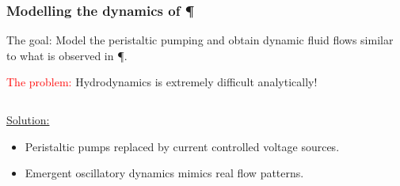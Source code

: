 \documentclass[	hyperref={pdfpagelabels=false}, xcolor=dvipsnames,
		11pt]{beamer}
\begin{document}
\begin{frame}
    \frametitle{Modelling the dynamics of \P} 

    \begin{block}{The goal:}
    	\vspace{-0.25cm}
    	Model the peristaltic pumping and obtain dynamic fluid flows similar to what is observed in \P.
    \end{block}

	\textcolor{red}{The problem:} Hydrodynamics is extremely difficult analytically!

	\begin{columns}
	\begin{column}{4.5cm}

	\begin{overprint}

		\begin{alertblock}{\underline{Solution:}}
		  \begin{itemize}
		   \item Peristaltic pumps replaced by current controlled voltage sources.
		   \item Emergent oscillatory dynamics mimics real flow patterns.
		  \end{itemize}
		\end{alertblock}
	\end{overprint}

	\end{column}

	\begin{column}{5cm}
	\begin{overprint}

\end{overprint}
\end{column}
\end{columns}
\end{frame}
\end{document}
